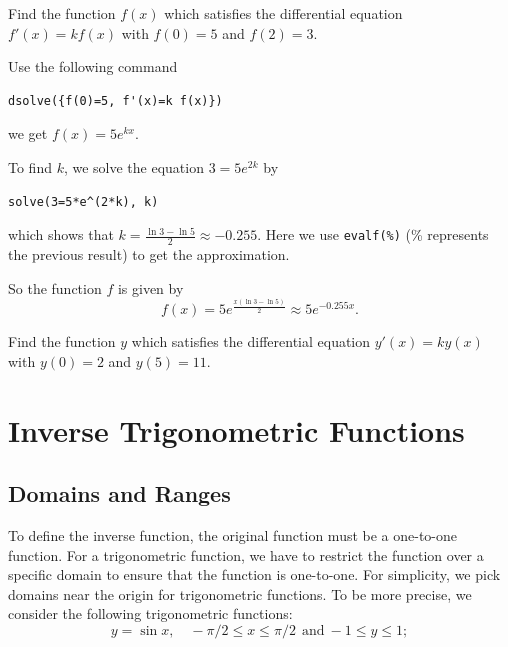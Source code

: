 \documentclass[en,11pt,simple]{elegantbook}
\let\BeginKnitrBlock\begin \let\EndKnitrBlock\end
\begin{document}
\BeginKnitrBlock{example}{}{}
\protect\hypertarget{exm:unnamed-chunk-182}{}{\label{exm:unnamed-chunk-182} }Find the function \(f(x)\) which satisfies the differential equation \(f'(x)=k f(x)\) with \(f(0)=5\) and \(f(2)=3\).
\EndKnitrBlock{example}

\BeginKnitrBlock{solution}{}{}
{}
Use the following command

\begin{verbatim}
dsolve({f(0)=5, f'(x)=k f(x)})
\end{verbatim}

we get \(f(x)=5e^{kx}\).

To find \(k\), we solve the equation \(3=5e^{2k}\) by

\begin{verbatim}
solve(3=5*e^(2*k), k)
\end{verbatim}

which shows that \(k=\frac{\ln3-\ln5}{2}\approx -0.255\).
Here we use \texttt{evalf(\%)} (\% represents the previous result) to get the approximation.

So the function \(f\) is given by
\[
f(x)=5e^{\frac{x(\ln3-\ln5)}{2}}\approx 5e^{-0.255x}.
\]
\EndKnitrBlock{solution}

\BeginKnitrBlock{exercise}{}{}
\protect\hypertarget{exr:unnamed-chunk-184}{}{\label{exr:unnamed-chunk-184} }
Find the function \(y\) which satisfies the differential equation \(y'(x)=k y(x)\) with \(y(0)=2\) and \(y(5)=11\).
\EndKnitrBlock{exercise}

\hypertarget{inverse-trigonometric-functions}{%
\section{Inverse Trigonometric Functions}\label{inverse-trigonometric-functions}}

\hypertarget{domains-and-ranges}{%
\subsection{Domains and Ranges}\label{domains-and-ranges}}

To define the inverse function, the original function must be a one-to-one function.
For a trigonometric function, we have to restrict the function over a specific domain to ensure that the function is one-to-one.
For simplicity, we pick domains near the origin for trigonometric functions. To be more precise, we consider the following trigonometric functions:
\[
y=\sin x,\quad -\pi/2\leq x\leq \pi/2 ~~\text{and}~ -1\leq y\leq 1;
\]
\end{document}

